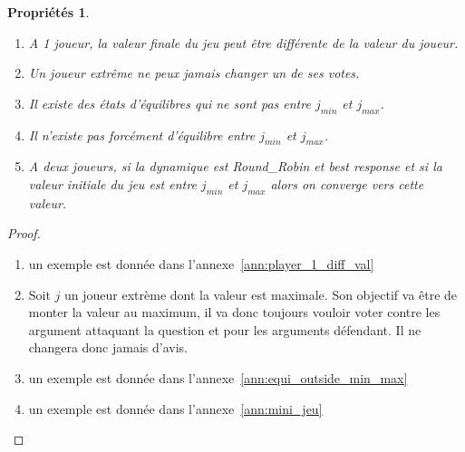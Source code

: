 \documentclass[11pt]{article}
\theoremstyle{defi}
\newtheorem{propriete}{Propriétés}[section]
\theoremstyle{not}
\theoremstyle{prob}
\begin{document}
        \begin{propriete}
          \begin{enumerate}
            \item A 1 joueur, la valeur finale du jeu peut être différente de la valeur du joueur.
            \item Un joueur extrême ne peux jamais changer un de ses votes.
            \item Il existe des états d'équilibres qui ne sont pas entre $j_{min}$ et $j_{max}$.
            \item Il n'existe pas forcément d'équilibre entre $j_{min}$ et $j_{max}$.
            \item A deux joueurs, si la dynamique est  \emph{Round\_Robin} et \emph{best response} et si la valeur initiale du jeu est entre $j_{min}$ et $j_{max}$ alors on converge vers cette valeur.
          \end{enumerate}
        \end{propriete}

        \begin{proof}

          \begin{enumerate}
            \item un exemple est donnée dans l'annexe~\ref{ann:player_1_diff_val}
            \item Soit $j$ un joueur extrème dont la valeur est maximale.
            Son objectif va être de monter la valeur au maximum, il va donc toujours vouloir voter contre les argument attaquant la question et pour les arguments défendant.
            Il ne changera donc jamais d'avis.
            \item un exemple est donnée dans l'annexe~\ref{ann:equi_outside_min_max}
            \item un exemple est donnée dans l'annexe~\ref{ann:mini_jeu}
          \end{enumerate}
        \end{proof}
\end{document}
